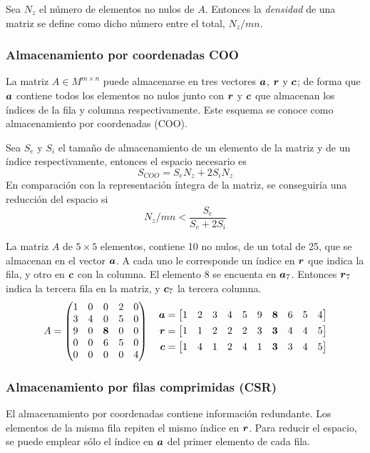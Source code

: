 Sea $N_z$ el número de elementos no nulos de $A$. Entonces la \textit{densidad} 
de una matriz se define como dicho número entre el total, $N_z/mn$.

\subsubsection{Almacenamiento por coordenadas COO}

La matriz $A \in M^{m\times n}$ puede almacenarse en tres vectores $\boldsymbol{a}$, $\boldsymbol{r}$ y 
$\boldsymbol{c}$; de forma que $\boldsymbol{a}$ contiene todos los elementos no nulos junto con $\boldsymbol{r}$ y 
$\boldsymbol{c}$ que almacenan los índices de la fila y columna respectivamente. Este 
esquema se conoce como almacenamiento por coordenadas (COO).

Sea $S_e$ y $S_i$ el tamaño de almacenamiento de un elemento de la matriz y de 
un índice respectivamente, entonces el espacio necesario es
$$ S_{COO} = S_eN_z + 2S_iN_z$$
En comparación con la representación íntegra de la matriz, se conseguiría una 
reducción del espacio si
$$ N_z/mn < \frac{S_e}{S_e + 2S_i} $$

\begin{ejemplo}
La matriz $A$ de $5\times5$ elementos, contiene 10 no nulos, de un total de 25, 
que se almacenan en el vector $\boldsymbol{a}$. A cada uno le corresponde un índice en $\boldsymbol{r}$ 
que indica la fila, y otro en $\boldsymbol{c}$ con la columna. El elemento 8 se encuenta en 
$\boldsymbol{a}_7$.  Entonces $\boldsymbol{r}_7$ indica la tercera fila en la matriz, y $\boldsymbol{c}_7$ la 
tercera columna.
$$ A = \begin{pmatrix} 
	1 & 0 & 0 & 2 & 0 \\
	3 & 4 & 0 & 5 & 0 \\
	9 & 0 & \textbf{8} & 0 & 0 \\
	0 & 0 & 6 & 5 & 0 \\
	0 & 0 & 0 & 0 & 4  \end{pmatrix}
\quad
\begin{aligned}
	\boldsymbol{a} = \begin{bmatrix}  1 & 2 & 3 & 4 & 5 & 9 & \textbf{8} & 6 & 5 & 4 \end{bmatrix} \\
	\boldsymbol{r} = \begin{bmatrix}  1 & 1 & 2 & 2 & 2 & 3 & \textbf{3} & 4 & 4 & 5 \end{bmatrix} \\
	\boldsymbol{c} = \begin{bmatrix}  1 & 4 & 1 & 2 & 4 & 1 & \textbf{3} & 3 & 4 & 5 \end{bmatrix}
\end{aligned}
$$
\end{ejemplo}

\subsubsection{Almacenamiento por filas comprimidas (CSR)}

El almacenamiento por coordenadas contiene información redundante. Los elementos 
de la misma fila repiten el mismo índice en $\boldsymbol{r}$. Para reducir el espacio, se 
puede emplear sólo el índice en $\boldsymbol{a}$ del primer elemento de cada fila.

